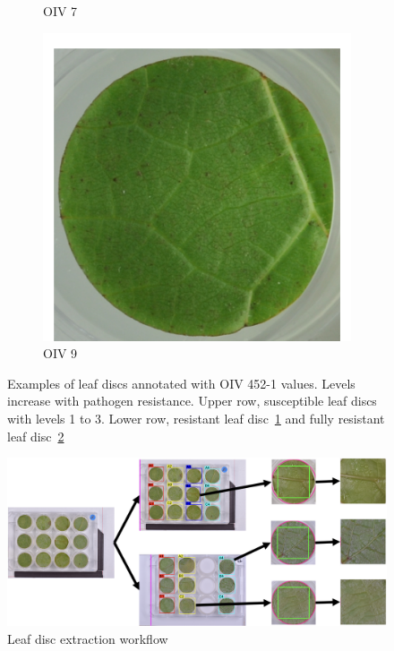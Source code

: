 \documentclass[english]{article}
\begin{document}
\begin{figure}[H]
\begin{subfigure}[b]{0.3\linewidth}
        \caption{OIV 7}\label{fig:oiv7}
    \end{subfigure}
    \begin{subfigure}[b]{0.3\linewidth}
        \includegraphics[width=\linewidth]{oiv9.png}
        \caption{OIV 9}\label{fig:oiv9}
    \end{subfigure}
    \caption{Examples of leaf discs annotated with OIV 452-1 values. Levels increase with pathogen resistance. Upper row, susceptible leaf discs with levels 1 to 3. Lower row, resistant leaf disc~\ref{fig:oiv7} and fully resistant leaf disc~\ref{fig:oiv9}}\label{fig:phenotypes}
\end{figure}

\begin{figure}[H]
    \begin{center}
        \includegraphics[width=0.9\linewidth]{2023_a_oiv_indexation}
        \caption{Leaf disc extraction workflow}\label{fig:preprocessing}
    \end{center}
\end{figure}
\end{document}
